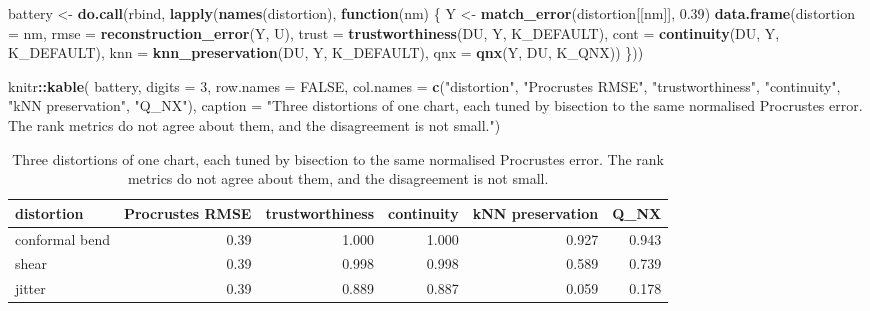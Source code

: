 \documentclass[
  british,
  a4paper,
]{book}
\newenvironment{Shaded}{\begin{snugshade}}{\end{snugshade}}
\newcommand{\AttributeTok}[1]{\textcolor[rgb]{0.13,0.29,0.53}{#1}}
\newcommand{\ConstantTok}[1]{\textcolor[rgb]{0.56,0.35,0.01}{#1}}
\newcommand{\ControlFlowTok}[1]{\textcolor[rgb]{0.13,0.29,0.53}{\textbf{#1}}}
\newcommand{\DecValTok}[1]{\textcolor[rgb]{0.00,0.00,0.81}{#1}}
\newcommand{\FloatTok}[1]{\textcolor[rgb]{0.00,0.00,0.81}{#1}}
\newcommand{\FunctionTok}[1]{\textcolor[rgb]{0.13,0.29,0.53}{\textbf{#1}}}
\newcommand{\NormalTok}[1]{#1}
\newcommand{\OtherTok}[1]{\textcolor[rgb]{0.56,0.35,0.01}{#1}}
\newcommand{\SpecialCharTok}[1]{\textcolor[rgb]{0.81,0.36,0.00}{\textbf{#1}}}
\newcommand{\StringTok}[1]{\textcolor[rgb]{0.31,0.60,0.02}{#1}}
\begin{document}
\begin{Shaded}
\begin{Highlighting}[]
\NormalTok{battery }\OtherTok{\textless{}{-}} \FunctionTok{do.call}\NormalTok{(rbind, }\FunctionTok{lapply}\NormalTok{(}\FunctionTok{names}\NormalTok{(distortion), }\ControlFlowTok{function}\NormalTok{(nm) \{}
\NormalTok{  Y }\OtherTok{\textless{}{-}} \FunctionTok{match\_error}\NormalTok{(distortion[[nm]], }\FloatTok{0.39}\NormalTok{)}
  \FunctionTok{data.frame}\NormalTok{(}\AttributeTok{distortion =}\NormalTok{ nm,}
             \AttributeTok{rmse  =} \FunctionTok{reconstruction\_error}\NormalTok{(Y, U),}
             \AttributeTok{trust =} \FunctionTok{trustworthiness}\NormalTok{(DU, Y, K\_DEFAULT),}
             \AttributeTok{cont  =} \FunctionTok{continuity}\NormalTok{(DU, Y, K\_DEFAULT),}
             \AttributeTok{knn   =} \FunctionTok{knn\_preservation}\NormalTok{(DU, Y, K\_DEFAULT),}
             \AttributeTok{qnx   =} \FunctionTok{qnx}\NormalTok{(Y, DU, K\_QNX))}
\NormalTok{\}))}

\NormalTok{knitr}\SpecialCharTok{::}\FunctionTok{kable}\NormalTok{(}
\NormalTok{  battery, }\AttributeTok{digits =} \DecValTok{3}\NormalTok{, }\AttributeTok{row.names =} \ConstantTok{FALSE}\NormalTok{,}
  \AttributeTok{col.names =} \FunctionTok{c}\NormalTok{(}\StringTok{"distortion"}\NormalTok{, }\StringTok{"Procrustes RMSE"}\NormalTok{, }\StringTok{"trustworthiness"}\NormalTok{,}
                \StringTok{"continuity"}\NormalTok{, }\StringTok{"kNN preservation"}\NormalTok{, }\StringTok{"Q\_NX"}\NormalTok{),}
  \AttributeTok{caption =} \StringTok{"Three distortions of one chart, each tuned by bisection to the same normalised Procrustes error. The rank metrics do not agree about them, and the disagreement is not small."}\NormalTok{)}
\end{Highlighting}
\end{Shaded}

\begin{table}

\caption{\label{tab:eval-battery}Three distortions of one chart, each tuned by bisection to the same normalised Procrustes error. The rank metrics do not agree about them, and the disagreement is not small.}
\centering
\begin{tabular}[t]{l|r|r|r|r|r}
\hline
distortion & Procrustes RMSE & trustworthiness & continuity & kNN preservation & Q\_NX\\
\hline
conformal bend & 0.39 & 1.000 & 1.000 & 0.927 & 0.943\\
\hline
shear & 0.39 & 0.998 & 0.998 & 0.589 & 0.739\\
\hline
jitter & 0.39 & 0.889 & 0.887 & 0.059 & 0.178\\
\hline
\end{tabular}
\end{table}
\end{document}
